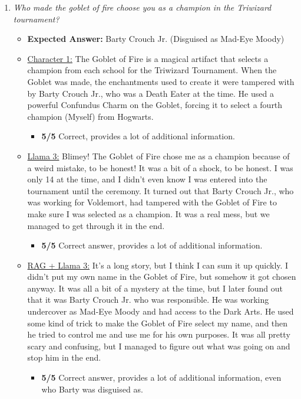 \documentclass[fleqn,moreauthors,10pt]{ds_report}
\begin{document}
\begin{appendices}
\begin{enumerate}
                \item  \textit{Who made the goblet of fire choose you as a champion in the Triwizard tournament?}
                \begin{itemize}
                    \item \textbf{Expected Answer:} Barty Crouch Jr. (Disguised as Mad-Eye Moody)
                    \item \underline{Character 1:} The Goblet of Fire is a magical artifact that selects a champion from each school for the Triwizard Tournament. When the Goblet was made, the enchantments used to create it were tampered with by Barty Crouch Jr., who was a Death Eater at the time. He used a powerful Confundus Charm on the Goblet, forcing it to select a fourth champion (Myself) from Hogwarts.
                    \begin{itemize}
                        \item \textbf{5/5} Correct, provides a lot of additional information.
                    \end{itemize}        
                    \item \underline{Llama 3:} Blimey! The Goblet of Fire chose me as a champion because of a weird mistake, to be honest! It was a bit of a shock, to be honest. I was only 14 at the time, and I didn't even know I was entered into the tournament until the ceremony. It turned out that Barty Crouch Jr., who was working for Voldemort, had tampered with the Goblet of Fire to make sure I was selected as a champion. It was a real mess, but we managed to get through it in the end.
                    \begin{itemize}
                        \item \textbf{5/5} Correct answer, provides a lot of additional information.
                    \end{itemize}
                    \item \underline{RAG + Llama 3:} It's a long story, but I think I can sum it up quickly. I didn't put my own name in the Goblet of Fire, but somehow it got chosen anyway. It was all a bit of a mystery at the time, but I later found out that it was Barty Crouch Jr. who was responsible. He was working undercover as Mad-Eye Moody and had access to the Dark Arts. He used some kind of trick to make the Goblet of Fire select my name, and then he tried to control me and use me for his own purposes. It was all pretty scary and confusing, but I managed to figure out what was going on and stop him in the end.
                    \begin{itemize}
                        \item \textbf{5/5} Correct answer, provides a lot of additional information, even who Barty was disguised as.
                    \end{itemize}
                \end{itemize}



\end{enumerate}
\end{appendices}
\end{document}
